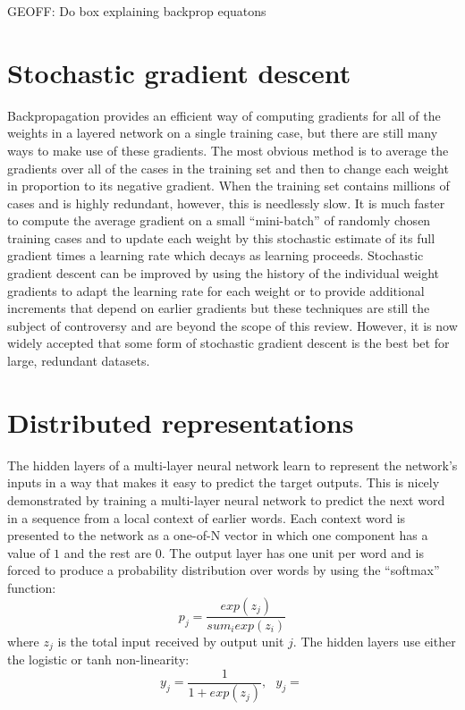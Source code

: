 \documentclass[]{article}
\begin{document}
GEOFF: Do box explaining backprop equatons

\section{Stochastic gradient descent}

Backpropagation provides an efficient way of computing gradients for all of
the weights in a layered network on a single training case, but there are
still many ways to make use of these gradients. The most obvious method is
to average the gradients over all of the cases in the training set and then
to change each weight in proportion to its negative gradient. When the
training set contains millions of cases and is highly redundant, however,
this is needlessly slow. It is much faster to compute the average gradient
on a small ``mini-batch'' of randomly chosen training cases and to update
each weight by this stochastic estimate of its full gradient times a
learning rate which decays as learning proceeds. Stochastic gradient
descent can be improved by using the history of the individual weight
gradients to adapt the learning rate for each weight\cite{bottou-bousquet}
or to provide additional increments that depend on earlier gradients\cite{}
but these techniques are still the subject of controversy and are beyond
the scope of this review.  However, it is now widely accepted that some
form of stochastic gradient descent is the best bet for large, redundant
datasets.

\section{Distributed representations}

The hidden layers of a multi-layer neural network learn to represent the
network's inputs in a way that makes it easy to predict the target
outputs. This is nicely demonstrated by training a multi-layer neural
network to predict the next word in a sequence from a local context of
earlier words. Each context word is presented to the network as a one-of-N
vector in which one component has a value of $1$ and the rest are $0$. The
output layer has one unit per word and is forced to produce a probability
distribution over words by using the ``softmax'' function:
\begin{equation}
p_j = \frac{exp(z_j)}{sum_i exp(z_i)}
\end{equation}
where $z_j$ is the total input received by output unit $j$. The hidden
layers use either the logistic or tanh non-linearity:
\begin{equation}
y_j = \frac{1}{1+ exp(z_j)}, \ \ \ y_j = \frac{}{}
\end{equation}
\end{document}
